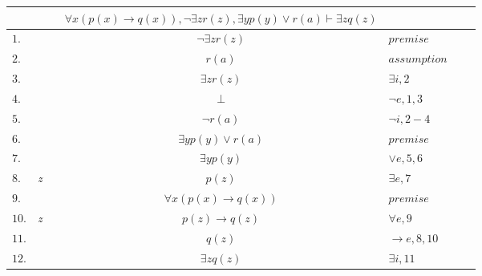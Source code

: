 \documentclass[12pt]{article}
\begin{document}
\begin{table}[H]
    \centering
    \begin{tabular}{lllclrr}
        & & & $\forall x (p(x) \rightarrow q(x)), \neg \exists z r(z), \exists y p(y) \lor r(a) \vdash \exists z q(z)$ & & & \\
        \hline
        \hline
        $1.$ & & & $\neg \exists z r(z)$ & $premise$ & & \\
        \cline{2-7}
        $2.$ & \multicolumn{1}{|c}{} & & $r(a)$ & $assumption$ & & \multicolumn{1}{c|}{} \\
        $3.$ & \multicolumn{1}{|c}{} & & $\exists z r(z)$ & $\exists i, 2$ & & \multicolumn{1}{c|}{} \\
        $4.$ & \multicolumn{1}{|c}{} & & $\bot$ & $\neg e, 1, 3$ & & \multicolumn{1}{c|}{} \\
        \cline{2-7}
        $5.$ & & & $\neg r(a)$ & $\neg i, 2-4$ & & \\
        $6.$ & & & $\exists y p(y) \lor r(a)$ & $premise$ & & \\
        $7.$ & & & $\exists y p(y)$ & $\lor e, 5,6$ & & \\
        $8.$ & \textit{z} & & $p(z)$ & $\exists e, 7$ & & \\
        $9.$ & & & $\forall x (p(x) \rightarrow q(x))$ & $premise$ & & \\
        $10.$ & \textit{z} & & $p(z) \rightarrow q(z)$ & $\forall e, 9$ & & \\
        $11.$ & & & $q(z)$ & $\rightarrow e, 8,10$ & & \\
        $12.$ & & & $\exists z q(z)$ & $\exists i, 11$ & & \\
    \end{tabular}
\end{table}
\end{document}
